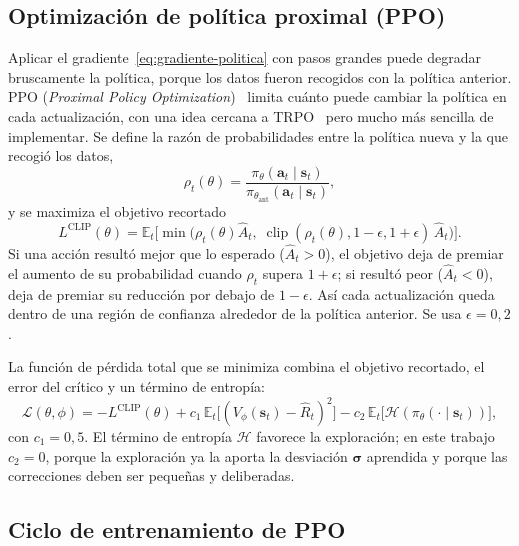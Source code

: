 \subsection{Optimización de política proximal (PPO)}

Aplicar el gradiente~\eqref{eq:gradiente-politica} con pasos grandes puede degradar bruscamente la política, porque los datos fueron recogidos con la política anterior. PPO (\emph{Proximal Policy Optimization})~\cite{schulman2017ppo} limita cuánto puede cambiar la política en cada actualización, con una idea cercana a TRPO~\cite{schulman2015trpo} pero mucho más sencilla de implementar. Se define la razón de probabilidades entre la política nueva y la que recogió los datos,
\begin{equation}
    \rho_t(\theta)=\frac{\pi_\theta(\mathbf{a}_t\mid\mathbf{s}_t)}{\pi_{\theta_{\text{ant}}}(\mathbf{a}_t\mid\mathbf{s}_t)},
\end{equation}
y se maximiza el objetivo recortado
\begin{equation}
    L^{\text{CLIP}}(\theta)=\mathbb{E}_t\Big[\min\big(\rho_t(\theta)\hat{A}_t,\;\operatorname{clip}(\rho_t(\theta),1-\epsilon,1+\epsilon)\,\hat{A}_t\big)\Big].
    \label{eq:ppo-clip}
\end{equation}
Si una acción resultó mejor que lo esperado ($\hat{A}_t>0$), el objetivo deja de premiar el aumento de su probabilidad cuando $\rho_t$ supera $1+\epsilon$; si resultó peor ($\hat{A}_t<0$), deja de premiar su reducción por debajo de $1-\epsilon$. Así cada actualización queda dentro de una región de confianza alrededor de la política anterior. Se usa $\epsilon=0{,}2$.

La función de pérdida total que se minimiza combina el objetivo recortado, el error del crítico y un término de entropía:
\begin{equation}
    \mathcal{L}(\theta,\phi)=-L^{\text{CLIP}}(\theta)+c_1\,\mathbb{E}_t\big[(V_\phi(\mathbf{s}_t)-\hat{R}_t)^2\big]-c_2\,\mathbb{E}_t\big[\mathcal{H}(\pi_\theta(\cdot\mid\mathbf{s}_t))\big],
    \label{eq:ppo-perdida}
\end{equation}
con $c_1=0{,}5$. El término de entropía $\mathcal{H}$ favorece la exploración; en este trabajo $c_2=0$, porque la exploración ya la aporta la desviación $\boldsymbol{\sigma}$ aprendida y porque las correcciones deben ser pequeñas y deliberadas.

\subsection{Ciclo de entrenamiento de PPO}

